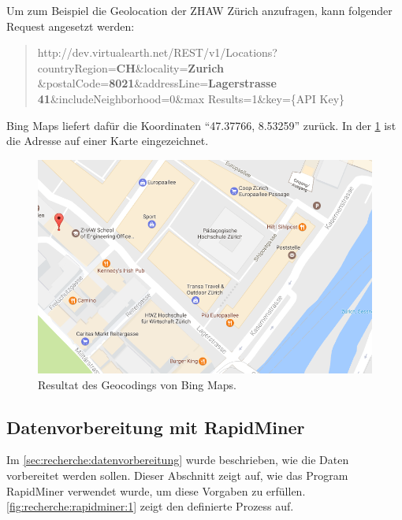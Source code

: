 Um zum Beispiel die Geolocation der ZHAW Zürich anzufragen, kann folgender Request angesetzt werden:

\blockquote[]{http://dev.virtualearth.net/REST/v1/Locations?countryRegion=\textbf{CH}\&locality=\textbf{Zurich} \&postalCode=\textbf{8021}\&addressLine=\textbf{Lagerstrasse 41}\&includeNeighborhood=0\&max Results=1\&key=\{API Key\}}

Bing Maps liefert dafür die Koordinaten "`47.37766, 8.53259"' zurück. In der \cref{fig:proofofconcept:datenvorbereitung:datenerweiterung:geolocation:1} ist die Adresse auf einer Karte eingezeichnet.

\begin{figure}[H]
	\RawFloats
	\centering
	\includegraphics[width=1\textwidth]{images/bing-maps-result}
	\caption{Resultat des Geocodings von Bing Maps.}
	\label{fig:proofofconcept:datenvorbereitung:datenerweiterung:geolocation:1}
\end{figure}

\subsection{Datenvorbereitung mit RapidMiner}
Im \cref{sec:recherche:datenvorbereitung} wurde beschrieben, wie die Daten vorbereitet werden sollen. Dieser Abschnitt zeigt auf, wie das Program RapidMiner verwendet wurde, um diese Vorgaben zu erfüllen. \cref{fig:recherche:rapidminer:1} zeigt den definierte Prozess auf.


